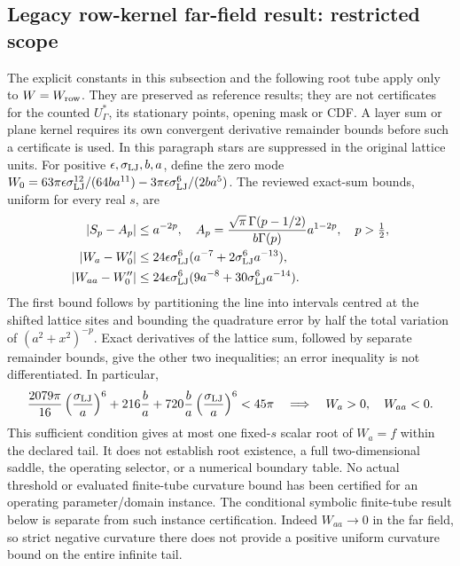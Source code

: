 \documentclass[11pt]{article}
\begin{document}
\subsection{Legacy row-kernel far-field result: restricted scope}
\label{sec:r11-row-tail-only}
The explicit constants in this subsection and the following root tube
apply only to $W=W_{\rm row}$. They are preserved as reference results;
they are not certificates for the counted $U_\Gamma^*$, its stationary
points, opening mask or CDF. A layer sum or plane kernel requires its own
convergent derivative remainder bounds before such a certificate is used.
In this paragraph stars are suppressed in the original lattice units.
For positive $\epsilon,\sigma_{\rm LJ},b,a$, define the zero mode
$W_0=63\pi\epsilon\sigma_{\rm LJ}^{12}/(64ba^{11})
-3\pi\epsilon\sigma_{\rm LJ}^{6}/(2ba^5)$.
The reviewed exact-sum bounds, uniform for every real $s$, are
\begin{align}
 |S_p-A_p|&\leq a^{-2p},\quad
 A_p=\frac{\sqrt\pi\,\Gamma(p-1/2)}{b\Gamma(p)}a^{1-2p},\quad p>\tfrac12,\\
 |W_a-W_0'|&\leq24\epsilon\sigma_{\rm LJ}^6
 (a^{-7}+2\sigma_{\rm LJ}^6a^{-13}),\\
 |W_{aa}-W_0''|&\leq24\epsilon\sigma_{\rm LJ}^6
 (9a^{-8}+30\sigma_{\rm LJ}^6a^{-14}).
\end{align}
The first bound follows by partitioning the line into intervals centred at
the shifted lattice sites and bounding the quadrature error by half the total
variation of $(a^2+x^2)^{-p}$. Exact derivatives of the lattice sum, followed
by separate remainder bounds, give the other two inequalities; an error
inequality is not differentiated. In particular,
\begin{equation}
 \frac{2079\pi}{16}\left(\frac{\sigma_{\rm LJ}}a\right)^6
 +216\frac ba+720\frac ba\left(\frac{\sigma_{\rm LJ}}a\right)^6<45\pi
 \quad\Longrightarrow\quad W_a>0,\quad W_{aa}<0.
\end{equation}
This sufficient condition gives at most one fixed-$s$ scalar root of $W_a=f$
within the declared tail. It does not establish root existence, a full
two-dimensional saddle, the operating selector, or a numerical boundary table.
No actual threshold or evaluated finite-tube curvature bound has been
certified for an operating parameter/domain instance. The conditional
symbolic finite-tube result below is separate from such instance certification.
Indeed $W_{aa}\to0$ in the far field, so strict negative curvature there
does not provide a positive uniform curvature bound on the entire infinite tail.
\end{document}
